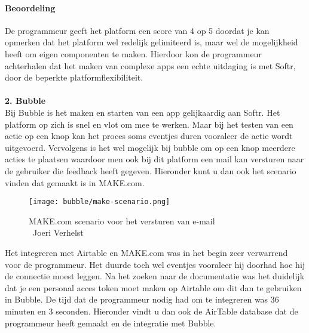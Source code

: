 \paragraph*{Beoordeling}
De programmeur geeft het platform een score van 4 op 5 doordat je kan opmerken dat het platform wel redelijk gelimiteerd is, maar wel de mogelijkheid heeft om eigen componenten te maken. 
Hierdoor kon de programmeur achterhalen dat het maken van complexe apps een echte uitdaging is met Softr, 
door de beperkte platformflexibiliteit.
\\
\\
\textbf{2. Bubble}
\\
Bij Bubble is het maken en starten van een app gelijkaardig aan Softr. Het platform op zich is snel en vlot om mee te werken. Maar bij het testen van een actie op een knop
kan het proces soms eventjes duren vooraleer de actie wordt uitgevoerd. Vervolgens is het wel mogelijk bij bubble om op een knop meerdere acties te plaatsen waardoor men ook 
bij dit platform een mail kan versturen naar de gebruiker die feedback heeft gegeven. Hieronder kunt u dan ook het scenario vinden dat gemaakt is in MAKE.com.
\\
\begin{figure}[H]
    \texttt{[image: bubble/make-scenario.png]}
    \caption[MAKE.com scenario voor het versturen van e-mail]{MAKE.com scenario voor het versturen van e-mail\\\textcopyright\ Joeri Verhelst}
    \label{fig:make-scenario-bubble}
\end{figure}
Het integreren met Airtable en MAKE.com was in het begin zeer verwarrend voor de programmeur. Het duurde toch wel eventjes vooraleer hij doorhad hoe hij de connectie moest leggen.
Na het zoeken naar de documentatie was het duidelijk dat je een personal acces token moet maken op Airtable om dit dan te gebruiken in Bubble. De tijd dat de programmeur nodig had 
om te integreren was 36 minuten en 3 seconden. Hieronder vindt u dan ook de AirTable database dat de programmeur heeft gemaakt en de integratie met Bubble.
\\
\\


